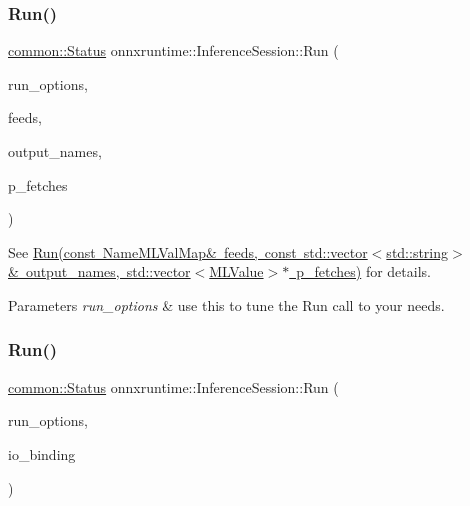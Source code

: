 \subsubsection{\texorpdfstring{Run()}{Run()}\hspace{0.1cm}{\footnotesize\ttfamily [2/4]}}
{\footnotesize\ttfamily \mbox{\hyperlink{classonnxruntime_1_1common_1_1Status}{common\+::\+Status}} onnxruntime\+::\+Inference\+Session\+::\+Run (\begin{DoxyParamCaption}\item[{const \mbox{\hyperlink{namespaceonnxruntime_a28ccb3d97f6827bf04d2ce259ff968f1}{Run\+Options}} \&}]{run\+\_\+options,  }\item[{const \mbox{\hyperlink{namespaceonnxruntime_a48b01f0410ec8d693dbd40d1132bd66c}{Name\+M\+L\+Val\+Map}} \&}]{feeds,  }\item[{const std\+::vector$<$ std\+::string $>$ \&}]{output\+\_\+names,  }\item[{std\+::vector$<$ \mbox{\hyperlink{classonnxruntime_1_1MLValue}{M\+L\+Value}} $>$ $\ast$}]{p\+\_\+fetches }\end{DoxyParamCaption})}

See \mbox{\hyperlink{classonnxruntime_1_1InferenceSession_a90aa8b5fdc2638c4d2c45afc9c3ed222}{Run(const Name\+M\+L\+Val\+Map\& feeds, const std\+::vector$<$std\+::string$>$\& output\+\_\+names, std\+::vector$<$\+M\+L\+Value$>$$\ast$ p\+\_\+fetches)}} for details. 
\begin{DoxyParams}{Parameters}
{\em run\+\_\+options} & use this to tune the Run call to your needs. \\
\hline
\end{DoxyParams}
\mbox{\label{classonnxruntime_1_1InferenceSession_aabfd4a072935636d0e9f975f015a7c47}} 
\subsubsection{\texorpdfstring{Run()}{Run()}\hspace{0.1cm}{\footnotesize\ttfamily [3/4]}}
{\footnotesize\ttfamily \mbox{\hyperlink{classonnxruntime_1_1common_1_1Status}{common\+::\+Status}} onnxruntime\+::\+Inference\+Session\+::\+Run (\begin{DoxyParamCaption}\item[{const \mbox{\hyperlink{namespaceonnxruntime_a28ccb3d97f6827bf04d2ce259ff968f1}{Run\+Options}} \&}]{run\+\_\+options,  }\item[{\mbox{\hyperlink{classonnxruntime_1_1IOBinding}{I\+O\+Binding}} \&}]{io\+\_\+binding }\end{DoxyParamCaption})}

